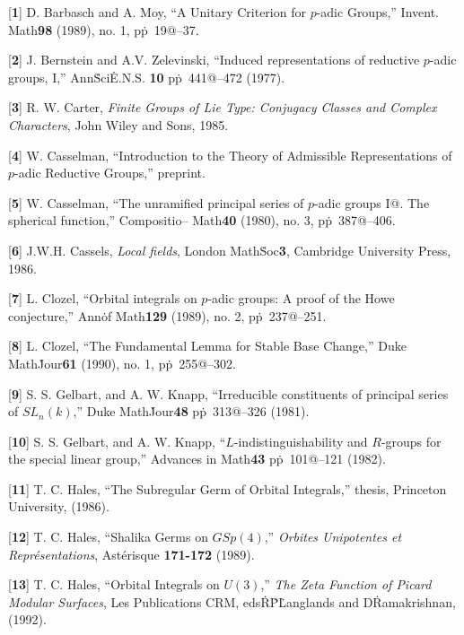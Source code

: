 %
\item{[{\bf 1}]}
  D. Barbasch and A. Moy,
  ``A Unitary Criterion for $p$-adic Groups,'' Invent. Math\. {\bf 98}
  (1989), no. 1, pp\.~19@--37.
%
\item{[{\bf 2}]}
  J. Bernstein and A.V. Zelevinski,
  ``Induced representations of reductive $p$-adic groups, I,''
  Ann\. Sci\. E.N.S. {\bf 10}
  pp\.~441@--472 (1977).
%
\item{[{\bf 3}]}
  R. W. Carter,
  {\sl Finite Groups of Lie Type: Conjugacy Classes and Complex
     Characters},
  John Wiley and Sons, 1985.
%
\item{[{\bf 4}]}
  W. Casselman,
  ``Introduction to the Theory of Admissible Representations
     of $p$-adic Reductive Groups,'' preprint.
%
\item{[{\bf 5}]}
  W. Casselman,
  ``The unramified principal series of $p$-adic groups I@. 
    The spherical function,'' Compositio-- Math\. {\bf 40}
    (1980), no. 3, pp\.~387@--406.
%
\item{[{\bf 6}]}
  J.W.H. Cassels,
  {\sl Local fields}, London Math\. Soc\. {\bf 3}, Cambridge
  University Press, 1986.
%
\item{[{\bf 7}]}
  L. Clozel,
  ``Orbital integrals on $p$-adic groups:  A proof of 
     the Howe conjecture,''  Ann\. of Math\. {\bf 129} (1989),
     no. 2, pp\.~237@--251.
%
\item{[{\bf 8}]}
  L. Clozel,
  ``The Fundamental Lemma for Stable Base Change,''
  Duke Math\. Jour\. {\bf 61} (1990), no. 1, pp\.~255@--302.
%
\item{[{\bf 9}]}
  S. S. Gelbart, and A. W. Knapp,
  ``Irreducible constituents of principal series of $SL_n(k)$,''
  Duke Math\. Jour\. {\bf 48} pp\.~313@--326 (1981).
%
\item{[{\bf 10}]}
  S. S. Gelbart, and A. W. Knapp,
  ``$L$-indistinguishability and $R$-groups for the
     special linear group,''
  Advances in Math\. {\bf 43} pp\.~101@--121 (1982).
%
\item{[{\bf 11}]}
  T. C. Hales,
  ``The Subregular Germ of Orbital Integrals,''
  thesis, Princeton University, (1986).
%
\item{[{\bf 12}]}
  T. C. Hales,\enspace%
  ``Shalika Germs on $GSp(4)$,''
  {\sl Orbites Uni\-po\-tentes et Repr\'e\-sen\-ta\-tions}, 
  Ast\'erisque {\bf 171-172} (1989).
%
\item{[{\bf 13}]}
  T. C. Hales,
  ``Orbital Integrals on $U(3)$,''
  {\sl The Zeta Function of Picard Modular Surfaces},
  Les Publications CRM, eds\. R\. P\. Langlands and
  D\. Ramakrishnan, (1992).

